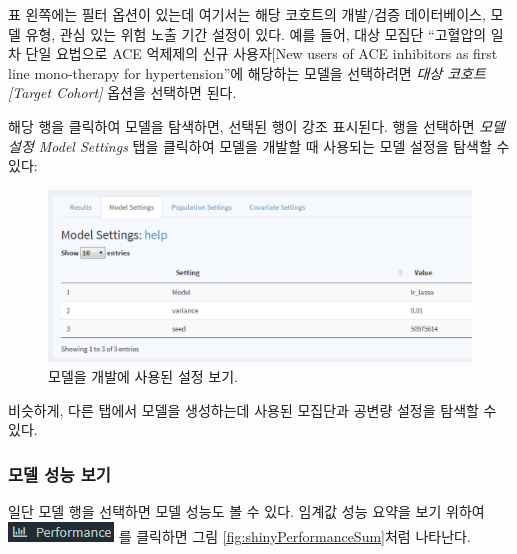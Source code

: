 \documentclass[10.5pt]{book}
\theoremstyle{definition}
\theoremstyle{definition}
\theoremstyle{definition}
\theoremstyle{remark}
\begin{document}
표 왼쪽에는 필터 옵션이 있는데 여기서는 해당 코호트의 개발/검증
데이터베이스, 모델 유형, 관심 있는 위험 노출 기간 설정이 있다. 예를
들어, 대상 모집단 ``고혈압의 일차 단일 요법으로 ACE 억제제의 신규
사용자{[}New users of ACE inhibitors as first line mono-therapy for
hypertension''에 해당하는 모델을 선택하려면 \emph{대상 코호트{[}Target
Cohort{]}} 옵션을 선택하면 된다.

해당 행을 클릭하여 모델을 탐색하면, 선택된 행이 강조 표시된다. 행을
선택하면 \emph{모델 설정 Model Settings} 탭을 클릭하여 모델을 개발할 때
사용되는 모델 설정을 탐색할 수 있다:

\begin{figure}

{\centering \includegraphics[width=1\linewidth]{images/PatientLevelPrediction/shiny/shinyModel} 

}

\caption{모델을 개발에 사용된 설정 보기.}\label{fig:shinyModel}
\end{figure}

비슷하게, 다른 탭에서 모델을 생성하는데 사용된 모집단과 공변량 설정을
탐색할 수 있다.

\subsubsection*{모델 성능 보기}\label{--}

일단 모델 행을 선택하면 모델 성능도 볼 수 있다. 임계값 성능 요약을 보기
위하여 \includegraphics{images/PatientLevelPrediction/performance.png}
를 클릭하면 그림 \ref{fig:shinyPerformanceSum}처럼 나타난다.
\end{document}
